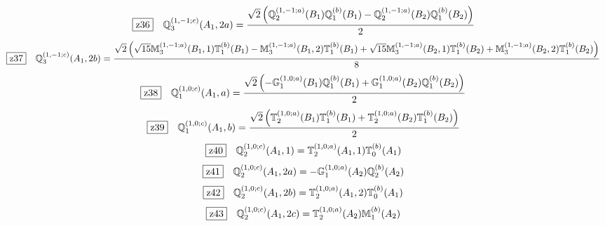 \documentclass[fleqn,10pt,landscape]{jsarticle}
\begin{document}
\begin{dmath*}
\hspace*{3mm}\fbox{z36}\quad \mathbb{Q}_{3}^{(1,-1;c)}(A_{1},2a)=\frac{\sqrt{2} \left(\mathbb{Q}_{2}^{(1,-1;a)}(B_{1}) \mathbb{Q}_{1}^{(b)}(B_{1}) - \mathbb{Q}_{2}^{(1,-1;a)}(B_{2}) \mathbb{Q}_{1}^{(b)}(B_{2})\right)}{2}
\end{dmath*}
\begin{dmath*}
\hspace*{3mm}\fbox{z37}\quad \mathbb{Q}_{3}^{(1,-1;c)}(A_{1},2b)=\frac{\sqrt{2} \left(\sqrt{15} \mathbb{M}_{3}^{(1,-1;a)}(B_{1},1) \mathbb{T}_{1}^{(b)}(B_{1}) - \mathbb{M}_{3}^{(1,-1;a)}(B_{1},2) \mathbb{T}_{1}^{(b)}(B_{1}) + \sqrt{15} \mathbb{M}_{3}^{(1,-1;a)}(B_{2},1) \mathbb{T}_{1}^{(b)}(B_{2}) + \mathbb{M}_{3}^{(1,-1;a)}(B_{2},2) \mathbb{T}_{1}^{(b)}(B_{2})\right)}{8}
\end{dmath*}
\begin{dmath*}
\hspace*{3mm}\fbox{z38}\quad \mathbb{Q}_{1}^{(1,0;c)}(A_{1},a)=\frac{\sqrt{2} \left(- \mathbb{G}_{1}^{(1,0;a)}(B_{1}) \mathbb{Q}_{1}^{(b)}(B_{1}) + \mathbb{G}_{1}^{(1,0;a)}(B_{2}) \mathbb{Q}_{1}^{(b)}(B_{2})\right)}{2}
\end{dmath*}
\begin{dmath*}
\hspace*{3mm}\fbox{z39}\quad \mathbb{Q}_{1}^{(1,0;c)}(A_{1},b)=\frac{\sqrt{2} \left(\mathbb{T}_{2}^{(1,0;a)}(B_{1}) \mathbb{T}_{1}^{(b)}(B_{1}) + \mathbb{T}_{2}^{(1,0;a)}(B_{2}) \mathbb{T}_{1}^{(b)}(B_{2})\right)}{2}
\end{dmath*}
\begin{dmath*}
\hspace*{3mm}\fbox{z40}\quad \mathbb{Q}_{2}^{(1,0;c)}(A_{1},1)=\mathbb{T}_{2}^{(1,0;a)}(A_{1},1) \mathbb{T}_{0}^{(b)}(A_{1})
\end{dmath*}
\begin{dmath*}
\hspace*{3mm}\fbox{z41}\quad \mathbb{Q}_{2}^{(1,0;c)}(A_{1},2a)=- \mathbb{G}_{1}^{(1,0;a)}(A_{2}) \mathbb{Q}_{2}^{(b)}(A_{2})
\end{dmath*}
\begin{dmath*}
\hspace*{3mm}\fbox{z42}\quad \mathbb{Q}_{2}^{(1,0;c)}(A_{1},2b)=\mathbb{T}_{2}^{(1,0;a)}(A_{1},2) \mathbb{T}_{0}^{(b)}(A_{1})
\end{dmath*}
\begin{dmath*}
\hspace*{3mm}\fbox{z43}\quad \mathbb{Q}_{2}^{(1,0;c)}(A_{1},2c)=\mathbb{T}_{2}^{(1,0;a)}(A_{2}) \mathbb{M}_{1}^{(b)}(A_{2})
\end{dmath*}
\end{document}
